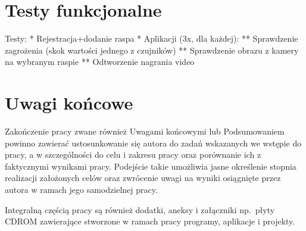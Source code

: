 \chapter{Testy funkcjonalne}

Testy:
 * Rejestracja+dodanie raspa
 * Aplikacji (3x, dla każdej):
 ** Sprawdzenie zagrożenia (skok wartości jednego z czujników)
 ** Sprawdzenie obrazu z kamery na wybranym raspie
 ** Odtworzenie nagrania video

\chapter{Uwagi końcowe}

Zakończenie pracy zwane również Uwagami końcowymi lub Podsumowaniem powinno zawierać ustosunkowanie
się autora do zadań wskazanych we wstępie do pracy, a w szczególności do celu i zakresu pracy oraz
porównanie ich z faktycznymi wynikami pracy. Podejście takie umożliwia jasne określenie stopnia
realizacji założonych celów oraz zwrócenie uwagi na wyniki osiągnięte przez autora w ramach jego
samodzielnej pracy.

Integralną częścią pracy są również dodatki, aneksy i załączniki np.~płyty CDROM
zawierające stworzone w ramach pracy programy, aplikacje i projekty.



